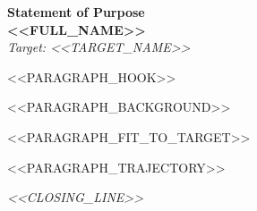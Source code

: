 \documentclass[11pt,a4paper]{article}
\begin{document}
\begin{center}
  {\Large\bfseries Statement of Purpose}\\[3pt]
  {\color{accent}\bfseries <<FULL_NAME>>}\\[2pt]
  \textit{Target: <<TARGET_NAME>>}  %
\end{center}
\vspace{6pt}


<<PARAGRAPH_HOOK>>

<<PARAGRAPH_BACKGROUND>>

<<PARAGRAPH_FIT_TO_TARGET>>

<<PARAGRAPH_TRAJECTORY>>

\vspace{8pt}
\noindent \textit{<<CLOSING_LINE>>}
\end{document}
